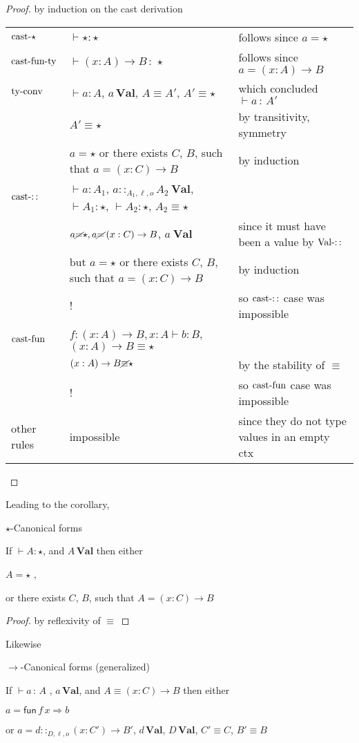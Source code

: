 \begin{proof}
by induction on the cast derivation

\begin{tabular}{lll}
$\operatorname{cast-\star}$ & $\vdash\star:\star$ & follows since $a=\star$\tabularnewline
$\operatorname{cast-fun-ty}$ & $\vdash\left(x:A\right)\rightarrow B\,:\,\star$ & follows since $a=\left(x:A\right)\rightarrow B$\tabularnewline
$\operatorname{ty-conv}$ & $\vdash a:A$, $a\,\textbf{Val}$, $A\equiv A'$, $A'\equiv\star$ & which concluded $\vdash a\,:\,A'$\tabularnewline
 & $A'\equiv\star$ & by transitivity, symmetry\tabularnewline
 & $a=\star$ or there exists $C$, $B$, such that $a=\left(x:C\right)\rightarrow B$  & by induction\tabularnewline
$\operatorname{cast-::}$ & $\vdash a:A_{1}$, $a::_{A_{1},\ensuremath{\ell},o}A_{2}\:\textbf{Val}$,$\vdash A_{1}:\star$,
$\vdash A_{2}:\star$, $A_{2}\equiv\star$ & \tabularnewline
 & $a\cancel{=}\star,a\cancel{=}\left(x:C\right)\rightarrow B$, $a\:\textbf{Val}$ & since it must have been a value by $\operatorname{Val-::}$ \tabularnewline
 & but $a=\star$ or there exists $C$, $B$, such that $a=\left(x:C\right)\rightarrow B$  & by induction \tabularnewline
 & ! & so $\operatorname{cast-::}$ case was impossible\tabularnewline
$\operatorname{cast-fun}$ & $f:\left(x:A\right)\rightarrow B,x:A\vdash b:B$, $\left(x:A\right)\rightarrow B\equiv\star$ & \tabularnewline
 & $\left(x:A\right)\rightarrow B\cancel{\equiv}\star$ & by the stability of $\equiv$\tabularnewline
 & ! & so $\operatorname{cast-fun}$ case was impossible\tabularnewline
other rules & impossible & since they do not type values in an empty ctx\tabularnewline
\end{tabular}
\end{proof}
Leading to the corollary,
\begin{cor}
$\star$-Canonical forms

If $\vdash A:\star$, and $A\,\textbf{Val}$ then either 

\textup{$A=\star$ , }

\textup{or there exists $C$, $B$, such that $A=\left(x:C\right)\rightarrow B$}
\end{cor}

\begin{proof}
by reflexivity of $\equiv$
\end{proof}
Likewise
\begin{lem}
$\rightarrow$-Canonical forms (generalized)

If $\vdash a\,:\,A$ , $a\,\textbf{Val}$, and $A\equiv\left(x:C\right)\rightarrow B$
then either

$a=\mathsf{fun}\,f\,x\Rightarrow b$ 

or $a=d::_{D,\ensuremath{\ell},o}\left(x:C'\right)\rightarrow B'$,
$d\,\textbf{Val}$, $D\,\textbf{Val}$, $C'\equiv C$, $B'\equiv B$ 
\end{lem}

